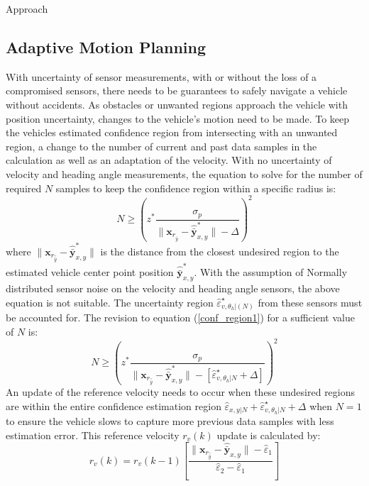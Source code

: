 \begin{section}{Approach}
\subsection{Adaptive Motion Planning}
With uncertainty of sensor measurements, with or without the loss of a compromised sensors, there needs to be guarantees to safely navigate a vehicle without accidents. As obstacles or unwanted regions approach the vehicle with position uncertainty, changes to the vehicle's motion need to be made. To keep the vehicles estimated confidence region from intersecting with an unwanted region, a change to the number of current and past data samples in the calculation as well as an adaptation of the velocity. With no uncertainty of velocity and heading angle measurements, the equation to solve for the number of required $N$ samples to keep the confidence region within a specific radius is:
    \begin{equation}
    \label{conf_region1}
	    N \geq \left(z^{*} \frac{ \sigma_p }{ {\lVert \bm{x}_{r_{\hat{\bar{y}}}} - \hat{\bar{\bm{y}}}_{x,y}^* \rVert} -\Delta } \right)^2
	\end{equation}
where $\lVert {\bm{x}_{r_{\hat{\bar{y}}}}-\hat{\bar{\bm{y}}}_{x,y}^*} \rVert$ is the distance from the closest undesired region to the estimated vehicle center point position $\hat{\bar{\bm{y}}}_{x,y}^*$.
With the assumption of Normally distributed sensor noise on the velocity and heading angle sensors, the above equation is not suitable. The uncertainty region $\hat{\varepsilon}_{v,\theta_h|(N)}^{\star}$ from these sensors must be accounted for. The revision to equation (\ref{conf_region1}) for a sufficient value of $N$ is:
    \begin{equation}
	    N \geq \left(z^{*} \frac{ \sigma_p }{ {\lVert \bm{x}_{r_{\hat{\bar{y}}}} - \hat{\bar{\bm{y}}}_{x,y}^* \rVert} -[\hat{\varepsilon}_{v,\theta_h|N}^{\star}+\Delta] } \right)^2
	\end{equation}
An update of the reference velocity needs to occur when these undesired regions are within the entire confidence estimation region $ \hat{\varepsilon}_{x,y|N} +\hat{\varepsilon}_{v,\theta_h|N}^{\star}+\Delta$ when $N=1$ to ensure the vehicle slows to capture more previous data samples with less estimation error. This reference velocity $r_v(k)$ update is calculated by:
    \begin{equation}
	    r_v(k)=r_v(k-1) \left[ \frac{\lVert \bm{x}_{r_{\hat{\bar{y}}}} - \hat{\bar{\bm{y}}}_{x,y} \rVert - \hat{\varepsilon}_1}{\hat{\varepsilon}_2 - \hat{\varepsilon}_1} \right]

\end{equation}
\end{section}
